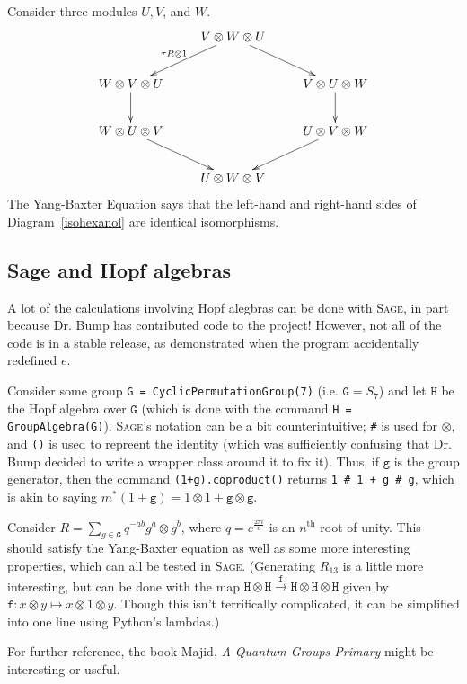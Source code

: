 Consider three modules $U,V$, and $W$.
\begin{equation}
\label{isohexanol}
\xymatrix{
& V\otimes W\otimes U \ar[ld]_{\tau R\otimes 1} \ar[rd] &\\
W\otimes V\otimes U \ar[d] && V\otimes U\otimes W\ar[d]\\
W\otimes U\otimes V \ar[rd] && U\otimes V\otimes W\ar[ld]\\
& U\otimes W\otimes V &
}
\end{equation}
The Yang-Baxter Equation says that the left-hand and right-hand sides of Diagram~\ref{isohexanol} are identical isomorphisms.
\subsection{{\sc Sage} and Hopf algebras}
A lot of the calculations involving Hopf alegbras can be done with \textsc{Sage}, in part because Dr. Bump has contributed code to the project! However, not all of the code is in a stable release, as demonstrated when the program accidentally redefined $e$.

Consider some group \texttt{G = CyclicPermutationGroup(7)} (i.e. $\mathtt G = S_7$) and let $\mathtt H$ be the Hopf algebra over $\mathtt G$ (which is done with the command \texttt{H = GroupAlgebra(G)}). \textsc{Sage}'s notation can be a bit counterintuitive; \verb+#+ is used for $\otimes$, and \texttt{()} is used to repreent the identity (which was sufficiently confusing that Dr. Bump decided  to write a wrapper class around it to fix it). Thus, if $\mathtt g$ is the group generator, then the command \texttt{(1+g).coproduct()} returns \verb!1 # 1 + g # g!, which is akin to saying $m^*(1+\mathtt g) = 1\otimes 1+\mathtt g\otimes \mathtt g$.

Consider $R = \sum_{g\in \mathtt G} q^{-ab} g^a\otimes g^b$, where $q = e^{\frac{2\pi i}{n}}$ is an $n^{\mathrm{th}}$ root of unity. This should satisfy the Yang-Baxter equation as well as some more interesting properties, which can all be tested in \textsc{Sage}. (Generating $R_{13}$ is a little more interesting, but can be done with the map $\mathtt H\otimes \mathtt H \stackrel{\mathtt f}{\to} \mathtt H\otimes \mathtt H\otimes \mathtt H$ given by $\mathtt f:x\otimes y \mapsto x\otimes 1\otimes y$. Though this isn't terrifically complicated, it can be simplified into one line using Python's lambdas.)

For further reference, the book Majid, \textit{A Quantum Groups Primary} might be interesting or useful.
